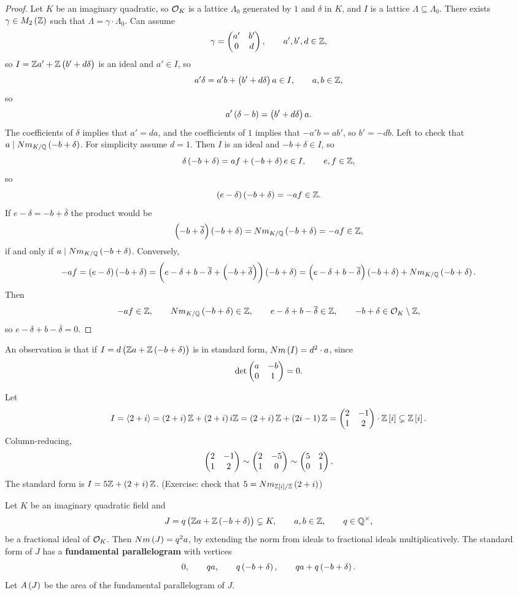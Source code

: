 \begin{proof}
Let $ K $ be an imaginary quadratic, so $ \mathcal{O}_K $ is a lattice $ \Lambda_0 $ generated by $ 1 $ and $ \delta $ in $ K $, and $ I $ is a lattice $ \Lambda \subseteq \Lambda_0 $. There exists $ \gamma \in M_2\br{\Z} $ such that $ \Lambda = \gamma \cdot \Lambda_0 $. Can assume
$$ \gamma = \begin{pmatrix} a' & b' \\ 0 & d \end{pmatrix}, \qquad a', b', d \in \mathbb{Z}, $$
so $ I = \Z a' + \Z\br{b' + d\delta} $ is an ideal and $ a' \in I $, so
$$ a'\delta = a'b + \br{b' + d\delta}a \in I, \qquad a, b \in \Z, $$
so
$$ a'\br{\delta - b} = \br{b' + d\delta}a. $$
The coefficients of $ \delta $ implies that $ a' = da $, and the coefficients of $ 1 $ implies that $ -a'b = ab' $, so $ b' = -db $. Left to check that $ a \mid Nm_{K / \Q}\br{-b + \delta} $. For simplicity assume $ d = 1 $. Then $ I $ is an ideal and $ -b + \delta \in I $, so
$$ \delta\br{-b + \delta} = af + \br{-b + \delta}e \in I, \qquad e, f \in \Z, $$
so
$$ \br{e - \delta}\br{-b + \delta} = -af \in \Z. $$
If $ e - \delta = -b + \overline{\delta} $ the product would be
$$ \br{-b + \overline{\delta}}\br{-b + \delta} = Nm_{K / \Q}\br{-b + \delta} = -af \in \Z, $$
if and only if $ a \mid Nm_{K / \Q}\br{-b + \delta} $. Conversely,
$$ -af = \br{e - \delta}\br{-b + \delta} = \br{e - \delta + b - \overline{\delta} + \br{-b + \overline{\delta}}}\br{-b + \delta} = \br{e - \delta + b - \overline{\delta}}\br{-b + \delta} + Nm_{K / \Q}\br{-b + \delta}. $$
Then
$$ -af \in \Z, \qquad Nm_{K / \Q}\br{-b + \delta} \in \Z, \qquad e - \delta + b - \overline{\delta} \in \Z, \qquad -b + \delta \in \OO_K \setminus \Z, $$
so $ e - \delta + b - \overline{\delta} = 0 $.
\end{proof}

An observation is that if $ I = d\br{\Z a + \Z\br{-b + \delta}} $ is in standard form, $ Nm\br{I} = d^2 \cdot a $, since
$$ \det\begin{pmatrix} a & -b \\ 0 & 1 \end{pmatrix} = 0. $$

\pagebreak


\begin{example*}
Let
$$ I = \abr{2 + i} = \br{2 + i}\Z + \br{2 + i}i\Z = \br{2 + i}\Z + \br{2i - 1}\Z = \twobytwo{2}{-1}{1}{2} \cdot \Z\sbr{i} \subsetneq \Z\sbr{i}. $$
Column-reducing,
$$ \begin{pmatrix} 2 & -1 \\ 1 & 2 \end{pmatrix} \sim \begin{pmatrix} 2 & -5 \\ 1 & 0 \end{pmatrix} \sim \begin{pmatrix} 5 & 2 \\ 0 & 1 \end{pmatrix}. $$
The standard form is $ I = 5\Z + \br{2 + i}\Z $. (Exercise: check that $ 5 = Nm_{\Z\sbr{i} / \Z}\br{2 + i} $)
\end{example*}

Let $ K $ be an imaginary quadratic field and
$$ J = q\br{\Z a + \Z\br{-b + \delta}} \subsetneq K, \qquad a, b \in \Z, \qquad q \in \Q^\times, $$
be a fractional ideal of $ \mathcal{O}_K $. Then $ Nm\br{J} = q^2a $, by extending the norm from ideals to fractional ideals multiplicatively. The standard form of $ J $ has a \textbf{fundamental parallelogram} with vertices
$$ 0, \qquad qa, \qquad q\br{-b + \delta}, \qquad qa + q\br{-b + \delta}. $$
Let $ A\br{J} $ be the area of the fundamental parallelogram of $ J $.

